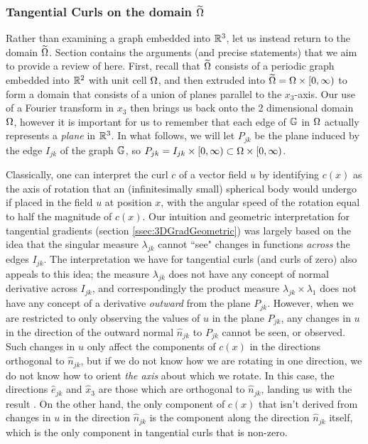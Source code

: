 \subsubsection{Tangential Curls on the domain $\widetilde{\Omega}$} \label{sssec:ktCurlsGeometric}
Rather than examining a graph embedded into $\mathbb{R}^3$, let us instead return to the domain $\widetilde{\Omega}$.
Section  contains the arguments (and precise statements) that we aim to provide a review of here.
First, recall that $\widetilde{\Omega}$ consists of a periodic graph embedded into $\mathbb{R}^2$ with unit cell $\Omega$, and then extruded into $\widetilde{\Omega} = \Omega\times[0,\infty)$ to form a domain that consists of a union of planes parallel to the $x_3$-axis.
Our use of a Fourier transform in $x_3$ then brings us back onto the 2 dimensional domain $\Omega$, however it is important for us to remember that each edge of $\mathbb{G}$ in $\Omega$ actually represents a \emph{plane} in $\mathbb{R}^3$.
In what follows, we will let $P_{jk}$ be the plane induced by the edge $I_{jk}$ of the graph $\mathbb{G}$, so $P_{jk} = I_{jk}\times[0,\infty)\subset\Omega\times[0,\infty)$.

Classically, one can interpret the curl $c$ of a vector field $u$ by identifying $c(x)$ as the axis of rotation that an (infinitesimally small) spherical body would undergo if placed in the field $u$ at position $x$, with the angular speed of the rotation equal to half the magnitude of $c(x)$.
Our intuition and geometric interpretation for tangential gradients (section \ref{ssec:3DGradGeometric}) was largely based on the idea that the singular measure $\lambda_{jk}$ cannot ``see" changes in functions \emph{across} the edges $I_{jk}$.
The interpretation we have for tangential curls (and curls of zero) also appeals to this idea; the measure $\lambda_{jk}$ does not have any concept of normal derivative across $I_{jk}$, and correspondingly the product measure $\lambda_{jk}\times\lambda_1$ does not have any concept of a derivative \emph{outward} from the plane $P_{jk}$.
However, when we are restricted to only observing the values of $u$ in the plane $P_{jk}$, any changes in $u$ in the direction of the outward normal $\hat{n}_{jk}$ to $P_{jk}$ cannot be seen, or observed.
Such changes in $u$ only affect the components of $c(x)$ in the directions orthogonal to $\hat{n}_{jk}$, but if we do not know how we are rotating in one direction, we do not know how to orient \emph{the axis} about which we rotate.
In this case, the directions $\hat{e}_{jk}$ and $\hat{x}_3$ are those which are orthogonal to $\hat{n}_{jk}$, landing us with the result .
On the other hand, the only component of $c(x)$ that isn't derived from changes in $u$ in the direction $\hat{n}_{jk}$ is the component along the direction $\hat{n}_{jk}$ itself, which is the only component in tangential curls that is non-zero. 

